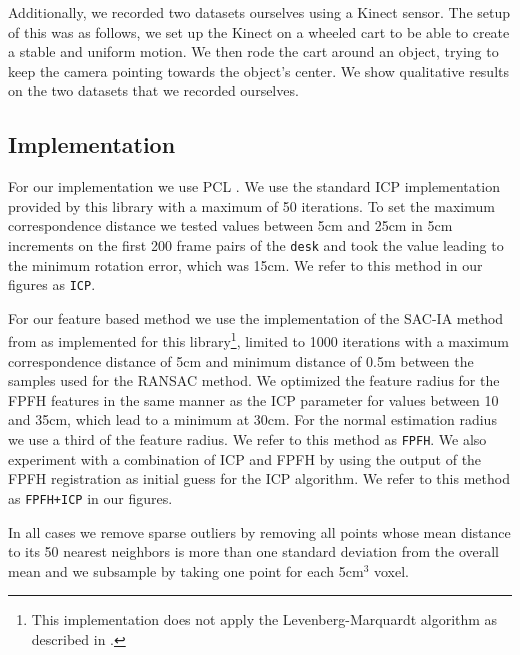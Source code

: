 \documentclass[a4paper]{article}
\begin{document}
Additionally, we recorded two datasets ourselves using a Kinect sensor. The setup of this was as follows, we set up the Kinect on a wheeled cart to be able to create a stable and uniform motion. We then rode the cart around an object, trying to keep the camera pointing towards the object's center. We show qualitative results on the two datasets that we recorded ourselves.

\subsection{Implementation}

For our implementation we use \ac{PCL} \cite{Rusu_ICRA2011_PCL}. We use the standard \ac{ICP} implementation provided by this library with a maximum of 50 iterations. To set the maximum correspondence distance we tested values between 5cm and 25cm in 5cm increments on the first 200 frame pairs of the \texttt{desk} and took the value leading to the minimum rotation error, which was 15cm. We refer to this method in our figures as \texttt{ICP}.

 For our feature based method we use the implementation of the \ac{SAC-IA} method from \cite{rusu2009fast} as implemented for this library\footnote{This implementation does not apply the Levenberg-Marquardt algorithm as described in \cite{rusu2009fast}.}, limited to 1000 iterations with a maximum correspondence distance of 5cm and minimum distance of 0.5m between the samples used for the \ac{RANSAC} method. We optimized the feature radius  for the \ac{FPFH} features in the same manner as the \ac{ICP} parameter for values between 10 and 35cm, which lead to a minimum at 30cm. For the normal estimation radius we use a third of the feature radius. We refer to this method as \texttt{FPFH}. We also experiment with a combination of \ac{ICP} and \ac{FPFH} by using the output of the \ac{FPFH} registration as initial guess for the \ac{ICP} algorithm. We refer to this method as \texttt{FPFH+ICP} in our figures.
 
In all cases we remove sparse outliers by removing all points whose mean distance to its 50 nearest neighbors is more than one standard deviation from the overall mean and we subsample by taking one point for each 5cm$^3$ voxel.

\end{document}
